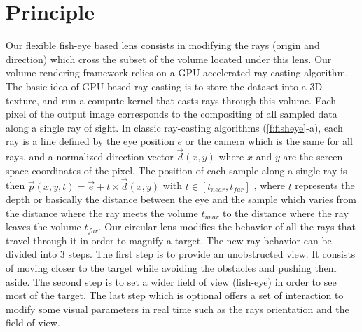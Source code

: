 \section{Principle}




Our flexible fish-eye based lens consists in modifying the rays (origin and direction) which cross the subset of the volume located under this lens.
Our volume rendering framework relies on a GPU accelerated ray-casting algorithm. The basic idea of GPU-based ray-casting is to store the dataset into a 3D texture, and run a compute kernel that casts rays through this volume. Each pixel of the output image corresponds to the compositing of all sampled data along a single ray of sight. In classic ray-casting algorithms (\autoref{f:fisheye}-a), each ray is a line defined by the eye position $e$ or the camera which is the same for all rays, and a normalized direction vector $\vec{d}\left(x,y\right)$  where $x$ and $y$ are the screen space coordinates of the pixel. The position of each sample along a single ray is then $\vec{p}\left(x,y,t\right) = \vec{e} + t \times \vec{d}\left(x,y\right)$ with $t \in \left[t_{near},t_{far}\right]$ , where $t$ represents the depth or basically the distance between the eye and the sample which varies from the distance where the ray meets the volume $t_{near}$ to the distance where the ray leaves the volume $t_{far}$.
Our circular lens modifies the behavior of all the rays that travel through it in order to magnify a target. The new ray behavior can be divided into 3 steps. The first step is to provide an unobstructed view. It consists of moving closer to the target while avoiding the obstacles and pushing them aside. The second step is to set a wider field of view (fish-eye) in order to see most of the target. The last step which is optional offers a set of interaction to modify some visual parameters in real time such as the rays orientation and the field of view.

